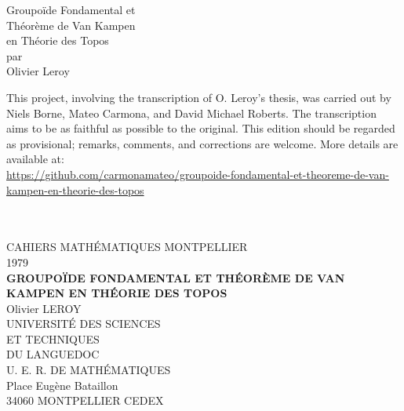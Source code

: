 \documentclass[12pt,twoside]{report} %
\begin{document}
\setcounter{tocdepth}{2}
\sloppy


\thispagestyle{empty}
\noindent\makebox[\linewidth]{\rule{4in}{0.01in}}
\vspace*{\fill}
\begin{center}
    {\Huge Groupoïde Fondamental et} \\
    \vspace{0.5em}
    {\Huge Théorème de Van Kampen} \\
    \vspace{0.5em}
    {\Huge en Théorie des Topos} \\
    \vspace{0.5em}
    {\Large par} \\
    \vspace{0.5em}
    {\huge Olivier Leroy}
\end{center}
\vspace*{\fill}
\noindent\makebox[\linewidth]{\rule{4in}{0.01in}}

\newpage 
\thispagestyle{empty}

\null\vfill
\noindent\begin{minipage}{\textwidth}
This project, involving the transcription of O. Leroy's thesis, was carried out by Niels Borne, Mateo Carmona, and David Michael Roberts. The transcription aims to be as faithful as possible to the original. This edition should be regarded as provisional; remarks, comments, and corrections are welcome. More details are available at: \\ \href{https://github.com/carmonamateo/groupoide-fondamental-et-theoreme-de-van-kampen-en-theorie-des-topos}{https://github.com/carmonamateo/groupoide-fondamental-et-theoreme-de-van-kampen-en-theorie-des-topos}
\end{minipage}

\newpage

\renewcommand{\contentsname}{TABLE DES MATIÈRES}
\tableofcontents\thispagestyle{empty}

\newpage

\thispagestyle{empty}
\begin{center}
\setlength{\baselineskip}{24pt}
\  \\
{
\ \\
[0.5in] CAHIERS MATHÉMATIQUES MONTPELLIER \\ 1979 \\
[1.5in] {\large \bf GROUPOÏDE FONDAMENTAL ET THÉORÈME DE VAN KAMPEN EN THÉORIE DES TOPOS} \\ Olivier LEROY \\
[2in] UNIVERSITÉ DES SCIENCES \\ ET TECHNIQUES \\ DU LANGUEDOC \\ U. E. R. DE MATHÉMATIQUES \\
Place Eugène Bataillon \\ 34060 MONTPELLIER CEDEX 
}
\end{center}
\vfill
\vfill
\vfill
\end{document}
